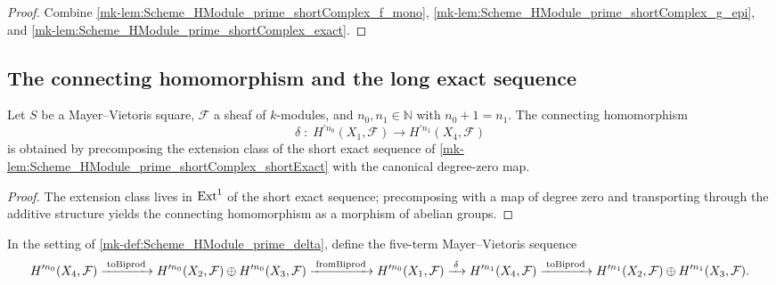 \begin{proof}
  \leanok

  Combine \ref{mk-lem:Scheme_HModule_prime_shortComplex_f_mono}, \ref{mk-lem:Scheme_HModule_prime_shortComplex_g_epi}, and \ref{mk-lem:Scheme_HModule_prime_shortComplex_exact}.
\end{proof}

\subsection{The connecting homomorphism and the long exact sequence}

\begin{definition}\label{mk-def:Scheme_HModule_prime_delta}
  \leanok


  Let \(S\) be a Mayer--Vietoris square, \(\mathcal F\) a sheaf of \(k\)-modules, and \(n_0, n_1 \in \mathbb N\) with \(n_0 + 1 = n_1\). The connecting homomorphism
  \[
    \delta \;:\; H^{\prime n_0}(X_1, \mathcal F) \longrightarrow H^{\prime n_1}(X_4, \mathcal F)
  \]
  is obtained by precomposing the extension class of the short exact sequence of \ref{mk-lem:Scheme_HModule_prime_shortComplex_shortExact} with the canonical degree-zero map.
\end{definition}

\begin{proof}
  \leanok

  The extension class lives in \(\operatorname{Ext}^1\) of the short exact sequence; precomposing with a map of degree zero and transporting through the additive structure yields the connecting homomorphism as a morphism of abelian groups.
\end{proof}

\begin{definition}\label{mk-def:Scheme_HModule_prime_sequence}
  \leanok


  In the setting of \ref{mk-def:Scheme_HModule_prime_delta}, define the five-term Mayer--Vietoris sequence
  \[
    H^{\prime n_0}(X_4, \mathcal F) \xrightarrow{\;\operatorname{toBiprod}\;} H^{\prime n_0}(X_2, \mathcal F) \oplus H^{\prime n_0}(X_3, \mathcal F) \xrightarrow{\;\operatorname{fromBiprod}\;} H^{\prime n_0}(X_1, \mathcal F) \xrightarrow{\;\delta\;} H^{\prime n_1}(X_4, \mathcal F) \xrightarrow{\;\operatorname{toBiprod}\;} H^{\prime n_1}(X_2, \mathcal F) \oplus H^{\prime n_1}(X_3, \mathcal F).
  \]
\end{definition}

